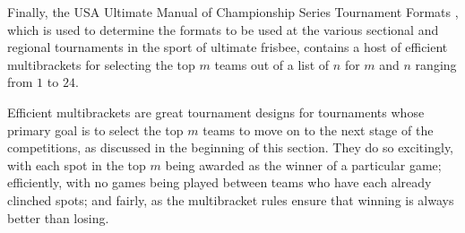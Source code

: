 {    Finally, the USA Ultimate Manual of Championship Series Tournament Formats \cite{ultimate}, which is used to determine the formats to be used at the various sectional and regional tournaments in the sport of ultimate frisbee, contains a host of efficient multibrackets for selecting the top $m$ teams out of a list of $n$ for $m$ and $n$ ranging from $1$ to $24.$

    Efficient multibrackets are great tournament designs for tournaments whose primary goal is to select the top $m$ teams to move on to the next stage of the competitions, as discussed in the beginning of this section. They do so excitingly, with each spot in the top $m$ being awarded as the winner of a particular game; efficiently, with no games being played between teams who have each already clinched spots; and fairly, as the multibracket rules ensure that winning is always better than losing.
}